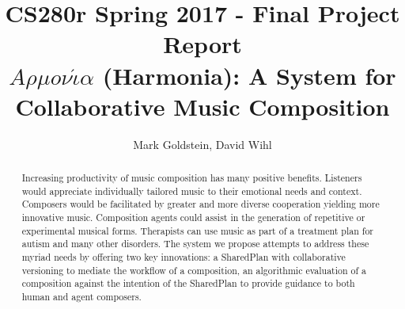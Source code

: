 \documentclass[final,authoryear,5p,times,twocolumn]{elsarticle}
\begin{document}
\begin{frontmatter}



\title{CS280r Spring 2017 - Final Project Report \\ $A \rho \mu o \nu \acute{\iota} \alpha$ (Harmonia): A System for Collaborative Music Composition}


\author{Mark Goldstein, David Wihl}
\address{\{markgoldstein,davidwihl\}@g.harvard.edu}

\begin{abstract}

Increasing productivity of music composition has many positive benefits. Listeners
would appreciate individually tailored music to their emotional needs and context.
Composers would be facilitated by greater and more diverse cooperation yielding more
innovative music. Composition agents could assist in the generation of repetitive or 
experimental musical forms. Therapists can use music as part of a treatment plan 
for autism and
many other disorders. The system we propose attempts to address these myriad needs 
by offering two key innovations: a SharedPlan with collaborative versioning to mediate the workflow of a composition, an algorithmic evaluation of a composition against the intention of the
SharedPlan to provide guidance to both human and agent composers.

\end{abstract}
\end{frontmatter}

\end{document}
